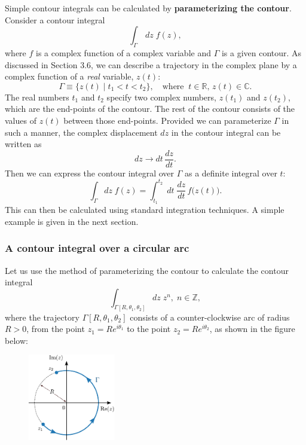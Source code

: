 \documentclass[10pt,a4paper]{article}
\begin{document}
Simple contour integrals can be calculated by \textbf{parameterizing the
contour}. Consider a contour integral
\begin{equation}
\int_\Gamma \, dz \; f(z),
\end{equation}
where $f$ is a complex function of a complex variable and $\Gamma$ is
a given contour.  As discussed in Section 3.6, we can describe a
trajectory in the complex plane by a complex function of a \emph{real}
variable, $z(t)$:
\begin{equation}
\Gamma \equiv \Big\{z(t) \;\Big|\; t_1 < t < t_2\Big\}, \quad \mathrm{where}\;\; t \in \mathbb{R}, \,z(t) \in \mathbb{C}.
\end{equation}
The real numbers $t_1$ and $t_2$ specify two complex numbers,
$z(t_1)$ and $z(t_2)$, which are the end-points of the contour. The
rest of the contour consists of the values of $z(t)$ between those
end-points. Provided we can parameterize $\Gamma$ in such a manner,
the complex displacement $dz$ in the contour integral can be written
as
\begin{equation}
dz \rightarrow dt\, \frac{dz}{dt}.
\end{equation}
Then we can express the contour integral over $\Gamma$ as a definite
integral over $t$:
\begin{equation}
\int_\Gamma dz\; f(z) = \int_{t_1}^{t_2} \; dt\; \frac{dz}{dt}\, f\big(z(t)\big).
\end{equation}
This can then be calculated using standard integration techniques. A
simple example is given in the next section.

\subsubsection{A contour integral over a circular arc}
\label{arc-contour}

Let us use the method of parameterizing the contour to calculate the
contour integral
\begin{equation}
 \int_{\Gamma[R, \theta_1,\theta_2]} dz\; z^n,\; n\in\mathbb{Z},
\end{equation}
where the trajectory $\Gamma[R, \theta_1,\theta_2]$ consists of a
counter-clockwise arc of radius $R > 0$, from the point $z_1 = R
e^{i\theta_1}$ to the point $z_2 = R e^{i\theta_2}$, as shown in the
figure below:

\begin{figure}[H]
  \centering\includegraphics[width=0.34\textwidth]{complex_integral_example}
\end{figure}
\end{document}
